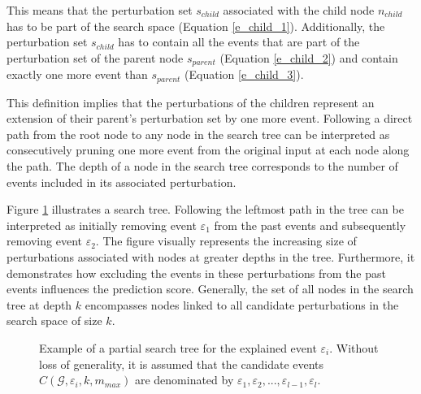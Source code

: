 This means that the perturbation set $s_{child}$ associated with the child node $n_{child}$ has to be part of the search space (Equation \ref{e_child_1}). Additionally, the perturbation set $s_{child}$ has to contain all the events that are part of the perturbation set of the parent node $s_{parent}$ (Equation \ref{e_child_2}) and contain exactly one more event than $s_{parent}$ (Equation \ref{e_child_3}).


This definition implies that the perturbations of the children represent an extension of their parent's perturbation set by one more event. Following a direct path from the root node to any node in the search tree can be interpreted as consecutively pruning one more event from the original input at each node along the path. The depth of a node in the search tree corresponds to the number of events included in its associated perturbation.

Figure \ref{f_SearchTree_Example} illustrates a search tree. Following the leftmost path in the tree can be interpreted as initially removing event $\varepsilon_1$ from the past events and subsequently removing event $\varepsilon_2$. The figure visually represents the increasing size of perturbations associated with nodes at greater depths in the tree. Furthermore, it demonstrates how excluding the events in these perturbations from the past events influences the prediction score. Generally, the set of all nodes in the search tree at depth $k$ encompasses nodes linked to all candidate perturbations in the search space of size $k$.




\begin{figure} [ht]
    \centering
    
    \caption{Example of a partial search tree for the explained event $\varepsilon_i$. Without loss of generality, it is assumed that the candidate events $C(\mathcal{G}, \varepsilon_i, k, m_{max})$ are denominated by $\varepsilon_1, \varepsilon_2, ..., \varepsilon_{l - 1}, \varepsilon_{l}$.}
    \label{f_SearchTree_Example}
\end{figure}

